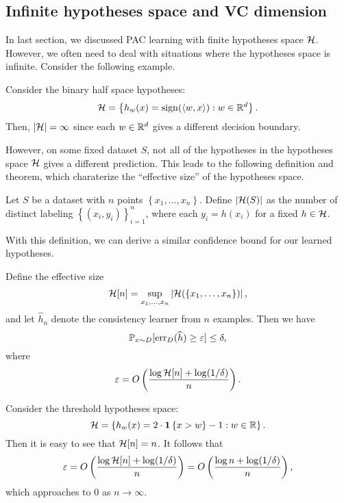 \documentclass[a4paper]{article}
\begin{document}
\subsection{Infinite hypotheses space and VC dimension}

In last section, we discussed PAC learning with finite
hypotheses space $\mathcal{H}$. However, we often need
to deal with situations where the hypotheses space
is infinite. Consider the following example.

\begin{eg}
  Consider the binary half space hypotheses:
  \[
  \mathcal{H} = \left\{ h_w(x) =
  \operatorname{sign}(\left\langle w, x \right\rangle) : w \in \mathbb{R}^d \right\}.
  \]
  Then, $\left\lvert \mathcal{H}\right\rvert = \infty$ since each
  $w \in \mathbb{R}^d$ gives a different decision boundary.
\end{eg}

However, on some fixed dataset $S$, not all of the hypotheses
in the hypotheses space $\mathcal{H}$ gives a different prediction.
This leads to the following definition and theorem, which
charaterize the ``effective size'' of the hypotheses
space.

\begin{defi}
  Let $S$ be a dataset with $n$ points
  $\left\{ x_1, \dots, x_n \right\}$. Define
  $\left\lvert \mathcal{H}(S)\right\rvert$ as the number of distinct labeling
  $\left\{ (x_i, y_i) \right\}_{i=1}^n$, where each
  $y_i = h(x_i)$ for a fixed $h \in \mathcal{H}$.
\end{defi}

With this definition, we can derive a similar confidence
bound for our learned hypotheses.

\begin{thm}
  Define the effective size
  \[
  \mathcal{H} [n] = \sup_{x_1, \dots, x_n}
  \left\lvert \mathcal{H}(\left\{ x_1, \dots, x_n \right\})\right\rvert,
  \]
  and let $\hat{h}_n$ denote the consistency learner
  from $n$ examples. Then we have
  \[
  \mathbb{P}_{x \sim D} [\operatorname{err}_D(\widehat{h}) \geq \varepsilon] \leq \delta,
  \]
  where
  \[
  \varepsilon = O \left(
    \frac{\log \mathcal{H}[n] + \log (1 / \delta)}{n}
   \right).
  \]
\end{thm}

\begin{eg}
  Consider the threshold hypotheses space:
  \[
  \mathcal{H} = \left\{ h_w(x) = 2 \cdot
  \mathbf{1} \left\{ x > w \right\} - 1 : w \in \mathbb{R} \right\}.
  \]
  Then it is easy to see that $\mathcal{H}[n] = n$.
  It follows that
  \[
  \varepsilon = O\left(
    \frac{\log \mathcal{H}[n] + \log (1 / \delta)}{n}
   \right) = O\left(
    \frac{\log n + \log (1 / \delta)}{n}
   \right),
  \]
  which approaches to $0$ as $n \to \infty$.
\end{eg}
\end{document}
